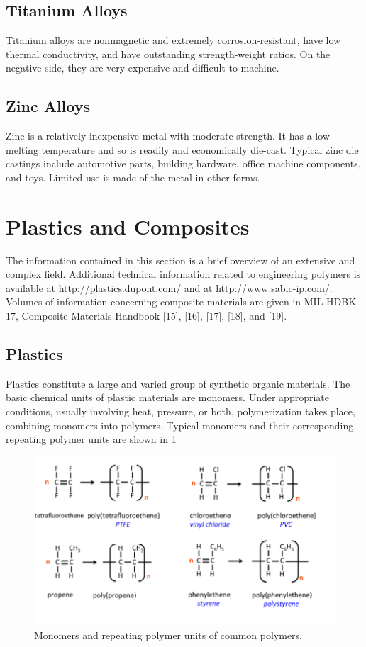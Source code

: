 \documentclass[a4paper,openany,12pt]{book}
\begin{document}
\subsection{Titanium Alloys}
\label{titanium-alloys}
Titanium alloys are nonmagnetic and extremely corrosion-resistant, have
low thermal conductivity, and have outstanding strength-weight ratios.
On the negative side, they are very expensive and difficult to machine.

\subsection{Zinc Alloys}
\label{zinc-alloys}
Zinc is a relatively inexpensive metal with moderate strength. It has a
low melting temperature and so is readily and economically die-cast.
Typical zinc die castings include automotive parts, building hardware,
office machine components, and toys. Limited use is made of the metal in
other forms.

\section{Plastics and Composites}
\label{plastics-and-composites}
The information contained in this section is a brief overview of an
extensive and complex field. Additional technical information related to
engineering polymers is available at \url{http://plastics.dupont.com/} and
at \url{http://www.sabic-ip.com/}. Volumes of information concerning
composite materials are given in MIL-HDBK 17, Composite Materials
Handbook [15], [16], [17], [18], and [19].

\subsection{Plastics}
\label{plastics}
Plastics constitute a large and varied group of synthetic organic
materials. The basic chemical units of plastic materials are monomers.
Under appropriate conditions, usually involving heat, pressure, or both,
polymerization takes place, combining monomers into polymers. Typical
monomers and their corresponding repeating polymer units are shown in
\ref{fig: polymers and repeating units}

\cite{secondaryscience4all}
\begin{figure}[htbp]
\centering
\includegraphics[width=.9\linewidth]{pictures/Material-selection/polymer.png}
\caption{\label{fig: polymers and repeating units}Monomers and repeating polymer units of common polymers.}
\end{figure}
\end{document}
